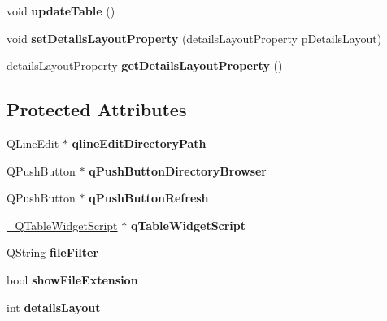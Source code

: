 \begin{DoxyCompactItemize}
\item 
\hypertarget{classQEScript_a0b3da013b1bbba009ba5a623ddb850ad}{
void {\bfseries updateTable} ()}
\label{classQEScript_a0b3da013b1bbba009ba5a623ddb850ad}

\item 
\hypertarget{classQEScript_aad8948f7eb70ecd33f79403f8e86c2b4}{
void {\bfseries setDetailsLayoutProperty} (detailsLayoutProperty pDetailsLayout)}
\label{classQEScript_aad8948f7eb70ecd33f79403f8e86c2b4}

\item 
\hypertarget{classQEScript_a91357c15cb30351f8561fb61143dff17}{
detailsLayoutProperty {\bfseries getDetailsLayoutProperty} ()}
\label{classQEScript_a91357c15cb30351f8561fb61143dff17}

\end{DoxyCompactItemize}
\subsection*{Protected Attributes}
\begin{DoxyCompactItemize}
\item 
\hypertarget{classQEScript_ab2d33cbae725153b7d575d6c99338e40}{
QLineEdit $\ast$ {\bfseries qlineEditDirectoryPath}}
\label{classQEScript_ab2d33cbae725153b7d575d6c99338e40}

\item 
\hypertarget{classQEScript_acc6e311acce3810d26edc3a981dd9211}{
QPushButton $\ast$ {\bfseries qPushButtonDirectoryBrowser}}
\label{classQEScript_acc6e311acce3810d26edc3a981dd9211}

\item 
\hypertarget{classQEScript_aa42531291cd371bd261170552b42cd48}{
QPushButton $\ast$ {\bfseries qPushButtonRefresh}}
\label{classQEScript_aa42531291cd371bd261170552b42cd48}

\item 
\hypertarget{classQEScript_aa921652c5478b2d589429873b8a6c3a9}{
\hyperlink{class__QTableWidgetScript}{\_\-QTableWidgetScript} $\ast$ {\bfseries qTableWidgetScript}}
\label{classQEScript_aa921652c5478b2d589429873b8a6c3a9}

\item 
\hypertarget{classQEScript_a506121da72d0ca59516500c06db1be84}{
QString {\bfseries fileFilter}}
\label{classQEScript_a506121da72d0ca59516500c06db1be84}

\item 
\hypertarget{classQEScript_ae124954d72d9d9452f9aba505c67a843}{
bool {\bfseries showFileExtension}}
\label{classQEScript_ae124954d72d9d9452f9aba505c67a843}

\item 
\hypertarget{classQEScript_af78c18db6c9260f9d8b27632e1e48d6c}{
int {\bfseries detailsLayout}}
\label{classQEScript_af78c18db6c9260f9d8b27632e1e48d6c}

\end{DoxyCompactItemize}
